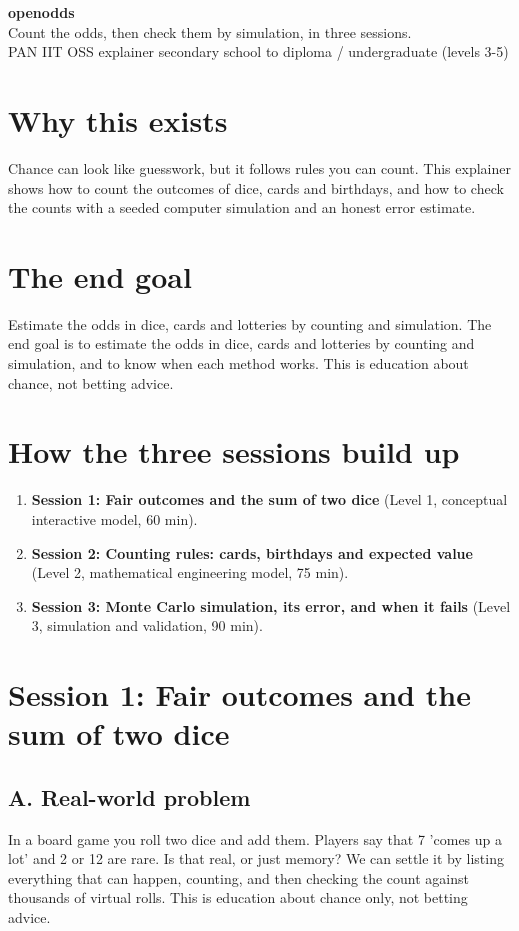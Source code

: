 \documentclass[11pt,a4paper]{article}
\begin{document}
\begin{center}{\LARGE\bfseries openodds}\\[0.4em]{\large Count the odds, then check them by simulation, in three sessions.}\\[0.2em]\small PAN IIT OSS explainer \textbullet{} secondary school to diploma / undergraduate (levels 3-5)\end{center}

\section*{Why this exists}
Chance can look like guesswork, but it follows rules you can count. This explainer shows how to count the outcomes of dice, cards and birthdays, and how to check the counts with a seeded computer simulation and an honest error estimate.

\section*{The end goal}
Estimate the odds in dice, cards and lotteries by counting and simulation. The end goal is to estimate the odds in dice, cards and lotteries by counting and simulation, and to know when each method works. This is education about chance, not betting advice.

\section*{How the three sessions build up}
\begin{enumerate}[nosep]
\item \textbf{Session 1: Fair outcomes and the sum of two dice} (Level 1, conceptual interactive model, 60 min).
\item \textbf{Session 2: Counting rules: cards, birthdays and expected value} (Level 2, mathematical engineering model, 75 min).
\item \textbf{Session 3: Monte Carlo simulation, its error, and when it fails} (Level 3, simulation and validation, 90 min).
\end{enumerate}

\section{Session 1: Fair outcomes and the sum of two dice}

\subsection*{A. Real-world problem}
In a board game you roll two dice and add them. Players say that 7 'comes up a lot' and 2 or 12 are rare. Is that real, or just memory? We can settle it by listing everything that can happen, counting, and then checking the count against thousands of virtual rolls. This is education about chance only, not betting advice.
\end{document}
